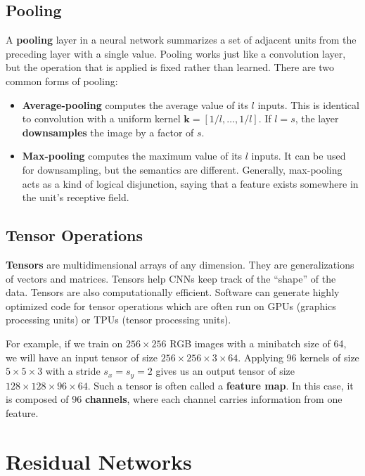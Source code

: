 \documentclass{article}
\begin{document}
\subsection{Pooling}

A \textbf{pooling} layer in a neural network summarizes a set of adjacent units from
the preceding layer with a single value. Pooling works just like a convolution layer,
but the operation that is applied is fixed rather than learned. There are two common
forms of pooling:

\begin{itemize}
    \item \textbf{Average-pooling} computes the average value of its $l$ inputs. This
        is identical to convolution with a uniform kernel $\textbf{k} = [1/l, \dots, 1/l]$.
        If $l = s$, the layer \textbf{downsamples} the image by a factor of $s$.
    \item \textbf{Max-pooling} computes the maximum value of its $l$ inputs. It can be
        used for downsampling, but the semantics are different. Generally, max-pooling
        acts as a kind of logical disjunction, saying that a feature exists somewhere
        in the unit's receptive field.
\end{itemize}

\subsection{Tensor Operations}

\textbf{Tensors} are multidimensional arrays of any dimension. They are generalizations
of vectors and matrices. Tensors help CNNs keep track of the ``shape'' of the data.
Tensors are also computationally efficient. Software can generate highly optimized code 
for tensor operations which are often run on GPUs (graphics processing units) or TPUs
(tensor processing units). 

For example, if we train on $256 \times 256$ RGB images with a minibatch size of 64,
we will have an input tensor of size $256 \times 256 \times 3 \times 64$. Applying
96 kernels of size $5 \times 5 \times 3$ with a stride $s_x = s_y = 2$ gives us an
output tensor of size $128 \times 128 \times 96 \times 64$. Such a tensor is
often called a \textbf{feature map}. In this case, it is composed of 96 \textbf{channels},
where each channel carries information from one feature.

\section{Residual Networks}
\end{document}
